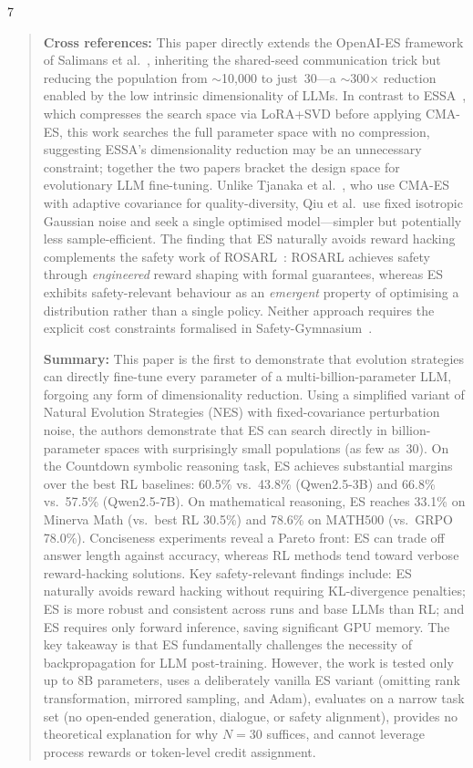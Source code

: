\documentclass[12pt, a4paper]{article}
\begin{document}
\begin{thebibliography}{7}
\begin{quotation}
\textbf{Cross references:} This paper directly extends the OpenAI-ES framework of Salimans et al.~\cite{salimans2017evolution}, inheriting the shared-seed communication trick but reducing the population from ${\sim}$10,000 to just~30---a ${\sim}$300$\times$ reduction enabled by the low intrinsic dimensionality of LLMs. In contrast to ESSA~\cite{korotyshova2025essa}, which compresses the search space via LoRA+SVD before applying CMA-ES, this work searches the full parameter space with no compression, suggesting ESSA's dimensionality reduction may be an unnecessary constraint; together the two papers bracket the design space for evolutionary LLM fine-tuning. Unlike Tjanaka et al.~\cite{tjanaka2022approximating}, who use CMA-ES with adaptive covariance for quality-diversity, Qiu et al.\ use fixed isotropic Gaussian noise and seek a single optimised model---simpler but potentially less sample-efficient. The finding that ES naturally avoids reward hacking complements the safety work of ROSARL~\cite{nanguetasse2024rosarl}: ROSARL achieves safety through \emph{engineered} reward shaping with formal guarantees, whereas ES exhibits safety-relevant behaviour as an \emph{emergent} property of optimising a distribution rather than a single policy. Neither approach requires the explicit cost constraints formalised in Safety-Gymnasium~\cite{ji2023safety}.

\textbf{Summary:} This paper is the first to demonstrate that evolution strategies can directly fine-tune every parameter of a multi-billion-parameter LLM, forgoing any form of dimensionality reduction. Using a simplified variant of Natural Evolution Strategies (NES) with fixed-covariance perturbation noise, the authors demonstrate that ES can search directly in billion-parameter spaces with surprisingly small populations (as few as~30). On the Countdown symbolic reasoning task, ES achieves substantial margins over the best RL baselines: 60.5\% vs.\ 43.8\% (Qwen2.5-3B) and 66.8\% vs.\ 57.5\% (Qwen2.5-7B). On mathematical reasoning, ES reaches 33.1\% on Minerva Math (vs.\ best RL 30.5\%) and 78.6\% on MATH500 (vs.\ GRPO 78.0\%). Conciseness experiments reveal a Pareto front: ES can trade off answer length against accuracy, whereas RL methods tend toward verbose reward-hacking solutions. Key safety-relevant findings include: ES naturally avoids reward hacking without requiring KL-divergence penalties; ES is more robust and consistent across runs and base LLMs than RL; and ES requires only forward inference, saving significant GPU memory. The key takeaway is that ES fundamentally challenges the necessity of backpropagation for LLM post-training. However, the work is tested only up to 8B parameters, uses a deliberately vanilla ES variant (omitting rank transformation, mirrored sampling, and Adam), evaluates on a narrow task set (no open-ended generation, dialogue, or safety alignment), provides no theoretical explanation for why $N{=}30$ suffices, and cannot leverage process rewards or token-level credit assignment.
\end{quotation}

\end{thebibliography}


\end{document}
